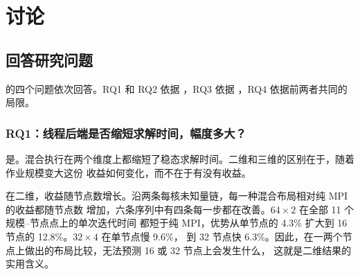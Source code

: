 \documentclass[11pt,a4paper,oneside]{report}
\let\OldSubsection\subsection
\renewcommand{\subsection}{\FloatBarrier\OldSubsection}
\begin{document}

\chapter{讨论}
\label{ch:discussion}

\section{回答研究问题}
\label{sec:rqs}
 的四个问题依次回答。RQ1 和 RQ2 依据 ，RQ3 依据
，RQ4 依据前两者共同的局限。

\subsection{RQ1：线程后端是否缩短求解时间，幅度多大？}
\label{sec:rq1}
是。混合执行在两个维度上都缩短了稳态求解时间。二维和三维的区别在于，随着作业规模变大这份
收益如何变化，而不在于有没有收益。

在二维，收益随节点数增长。沿两条每核未知量链，每一种混合布局相对纯 MPI 的收益都随节点数
增加，六条序列中有四条每一步都在改善。$64\times2$ 在全部 11 个规模--节点点上的单次迭代时间
都短于纯 MPI，优势从单节点的 4.3\% 扩大到 16 节点的 12.8\%。$32\times4$ 在单节点慢 9.6\%，
到 32 节点快 6.3\%。因此，在一两个节点上做出的布局比较，无法预测 16 或 32 节点上会发生什么，
这就是二维结果的实用含义。
\end{document}

